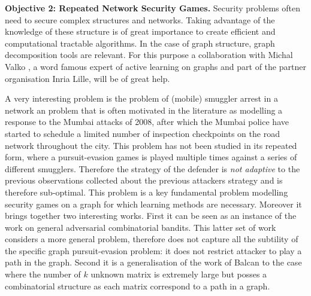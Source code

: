 \textbf{Objective 2:  Repeated Network Security Games.}
Security problems often need to secure complex structures and networks. Taking advantage of the knowledge of these structure is of great importance to create efficient and computational tractable algorithms. In the case of graph structure, graph decomposition  tools are relevant. For this purpose a collaboration with Michal Valko , a word famous expert of active learning on graphs and part of the partner organisation Inria Lille, will be of great help.
 

A very interesting problem is the problem of (mobile) smuggler arrest in a network\cite{jain2011double} an problem that is often motivated in the literature as modelling a  response  to  the  Mumbai  attacks  of  2008, after which the  Mumbai  police
have started to schedule a limited number of inspection checkpoints
on the road network throughout the city. This problem has not been studied in its repeated form, where a pursuit-evasion games is played multiple times against a series of different smugglers. Therefore the strategy of the defender is \textit{not adaptive} to the previous observations collected about the previous attackers strategy and is therefore sub-optimal. This problem is a key fundamental problem modelling security games on a graph for which learning methods are necessary. Moreover it brings together two interesting works. First it can be seen as an instance of the work on  general adversarial combinatorial bandits\cite{cesa2012combinatorial}. This latter set of work considers a more general problem, therefore does not capture all the subtility of the specific graph pursuit-evasion problem: it does not restrict attacker to play a path in the graph. Second it is a generalisation of the work of Balcan\cite{Balcan15CR} to the case where the number of $k$ unknown matrix is extremely large but posses a combinatorial structure as each matrix correspond to a path in a graph.  

